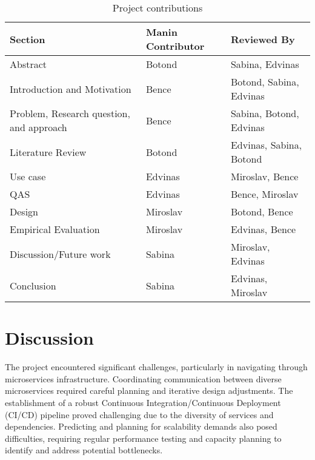 \documentclass[conference, onecolumn]{IEEEtran}
\begin{document}
\begin{table}[H]
    \centering
    \begin{tabular}{|l|l|l|}
    \toprule
                                     Section & Manin Contributor &           Reviewed By \\
    \midrule
                                    Abstract &   Botond &           Sabina, Edvinas \\
                 Introduction and Motivation &   Bence & Botond, Sabina, Edvinas \\
    Problem, Research question, and approach &   Bence & Sabina, Botond, Edvinas \\
                           Literature Review &   Botond & Edvinas, Sabina, Botond \\
                                    Use case &   Edvinas &           Miroslav, Bence \\
                                         QAS &   Edvinas &           Bence, Miroslav \\
                                      Design &   Miroslav &           Botond, Bence \\
                        Empirical Evaluation &   Miroslav &           Edvinas, Bence \\
                      Discussion/Future work &   Sabina &           Miroslav, Edvinas \\
                                  Conclusion &   Sabina &           Edvinas, Miroslav \\
    \bottomrule
    \end{tabular}
    \caption{Project contributions}
    \label{tab:project_contributions}
\end{table}

\section{Discussion}


The project encountered significant challenges, particularly in navigating through microservices infrastructure. Coordinating communication between diverse microservices required careful planning and iterative design adjustments. The establishment of a robust Continuous Integration/Continuous Deployment (CI/CD) pipeline proved challenging due to the diversity of services and dependencies. Predicting and planning for scalability demands also posed difficulties, requiring regular performance testing and capacity planning to identify and address potential bottlenecks.
\end{document}
